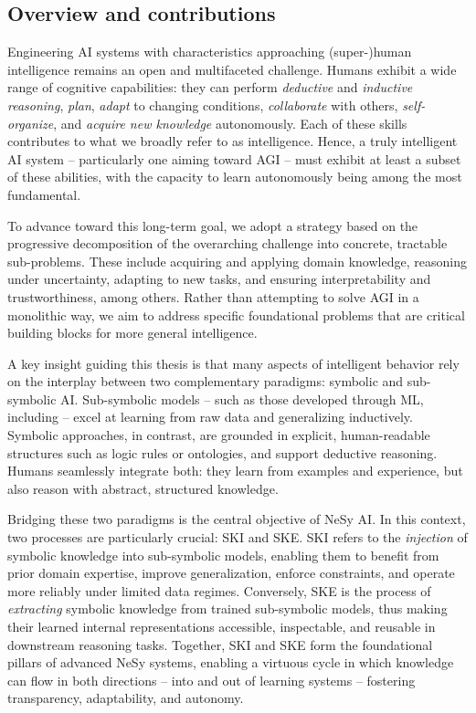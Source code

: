 \begin{refsection}
\section{Overview and contributions}
\label{sec:overview-and-contributions}
%
Engineering \gls{AI} systems with characteristics approaching (super-)human intelligence remains an open and multifaceted challenge.
%
Humans exhibit a wide range of cognitive capabilities: they can perform \emph{deductive} and \emph{inductive reasoning}, \emph{plan}, \emph{adapt} to changing conditions, \emph{collaborate} with others, \emph{self-organize}, and \emph{acquire new knowledge} autonomously.
%
Each of these skills contributes to what we broadly refer to as intelligence.
%
Hence, a truly intelligent \gls{AI} system -- particularly one aiming toward \gls{AGI} -- must exhibit at least a subset of these abilities, with the capacity to learn autonomously being among the most fundamental.


To advance toward this long-term goal, we adopt a strategy based on the progressive decomposition of the overarching challenge into concrete, tractable sub-problems.
%
These include acquiring and applying domain knowledge, reasoning under uncertainty, adapting to new tasks, and ensuring interpretability and trustworthiness, among others.
%
Rather than attempting to solve \gls{AGI} in a monolithic way, we aim to address specific foundational problems that are critical building blocks for more general intelligence.


A key insight guiding this thesis is that many aspects of intelligent behavior rely on the interplay between two complementary paradigms: symbolic and sub-symbolic \gls{AI}.
%
Sub-symbolic models -- such as those developed through \gls{ML}, including  -- excel at learning from raw data and generalizing inductively.
%
Symbolic approaches, in contrast, are grounded in explicit, human-readable structures such as logic rules or ontologies, and support deductive reasoning.
%
Humans seamlessly integrate both: they learn from examples and experience, but also reason with abstract, structured knowledge.


Bridging these two paradigms is the central objective of \gls{NeSy} \gls{AI}.
%
In this context, two processes are particularly crucial: \gls{SKI} and \gls{SKE}.
%
\Gls{SKI} refers to the \emph{injection} of symbolic knowledge into sub-symbolic models, enabling them to benefit from prior domain expertise, improve generalization, enforce constraints, and operate more reliably under limited data regimes.
%
Conversely, \gls{SKE} is the process of \emph{extracting} symbolic knowledge from trained sub-symbolic models, thus making their learned internal representations accessible, inspectable, and reusable in downstream reasoning tasks.
%
Together, \gls{SKI} and \gls{SKE} form the foundational pillars of advanced \gls{NeSy} systems, enabling a virtuous cycle in which knowledge can flow in both directions -- into and out of learning systems -- fostering transparency, adaptability, and autonomy.



\end{refsection}
